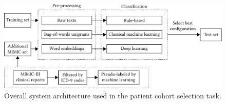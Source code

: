 \begin{figure}[!t]
\begin{center}
\includegraphics[width=\textwidth]{img/2018-n2c2-system/v4/img.pdf}
\caption{Overall system architecture used in the patient cohort selection task.}
\label{fig:2018-n2c2-system}
\end{center}
\end{figure}
